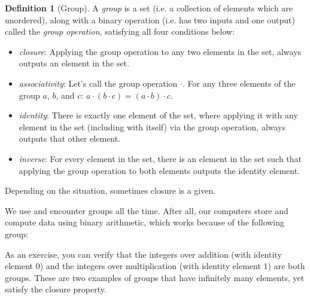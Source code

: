 \documentclass{article}
\theoremstyle{definition}
\newtheorem{definition}{Definition}
\begin{document}
\begin{definition}[Group]
	\label{def:group}
	A \textit{group} is a set (i.e. a collection of elements which are unordered), along with a binary operation (i.e. has two inputs and one output) called the \textit{group operation}, satisfying all four conditions below:
	\begin{itemize}
		\item \textit{closure}: Applying the group operation to any two elements in the set, always outputs an element in the set.
		\item \textit{associativity}: Let's call the group operation $\cdot$.  For any three elements of the group $a$, $b$, and $c$: $a \cdot (b \cdot c) = (a \cdot b) \cdot c$.
		\item \textit{identity}: There is exactly one element of the set, where applying it with any element in the set (including with itself) via the group operation, always outputs that other element.
		\item \textit{inverse}: For every element in the set, there is an element in the set such that applying the group operation to both elements outputs the identity element.
	\end{itemize}
\end{definition}
Depending on the situation, sometimes closure is a given.

We use and encounter groups all the time.  After all, our computers store and compute data using binary arithmetic, which works because of the following group:

As an exercise, you can verify that the integers over addition (with identity element $0$) and the integers over multiplication (with identity element $1$) are both groups.  These are two examples of groups that have infinitely many elements, yet satisfy the closure property.
\end{document}
